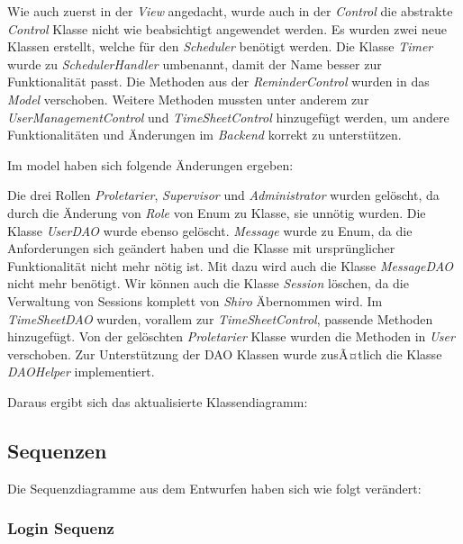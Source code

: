 Wie auch zuerst in der \emph{View} angedacht, wurde auch in der \emph{Control} die abstrakte \emph{Control} Klasse 
nicht wie beabsichtigt angewendet werden.
Es wurden zwei neue Klassen erstellt, welche für den \emph{Scheduler} benötigt werden. 
Die Klasse \emph{Timer} wurde zu \emph{SchedulerHandler} umbenannt, damit der Name besser zur Funktionalität passt.
Die Methoden aus der \emph{ReminderControl} wurden in das \emph{Model} verschoben.
Weitere Methoden mussten unter anderem zur \emph{UserManagementControl} und \emph{TimeSheetControl} hinzugefügt werden, 
um andere Funktionalitäten und Änderungen im \emph{Backend} korrekt zu unterstützen.

Im model haben sich folgende Änderungen ergeben: %

Die drei Rollen \emph{Proletarier}, \emph{Supervisor} und \emph{Administrator} wurden gelöscht, da durch 
die Änderung von \emph{Role} von Enum zu Klasse, sie unnötig wurden. Die Klasse \emph{UserDAO} wurde ebenso gelöscht.
\emph{Message} wurde zu Enum, da die Anforderungen sich geändert haben und 
die Klasse mit ursprünglicher Funktionalität nicht mehr nötig ist. Mit dazu wird auch die Klasse \emph{MessageDAO} nicht mehr benötigt.
Wir können auch die Klasse \emph{Session} löschen, da die Verwaltung von Sessions komplett von \emph{Shiro} Äbernommen wird.
Im \emph{TimeSheetDAO} wurden, vorallem zur \emph{TimeSheetControl}, passende Methoden hinzugefügt.
Von der gelöschten \emph{Proletarier} Klasse wurden die Methoden in \emph{User} verschoben.
Zur Unterstützung der DAO Klassen wurde zusÃ¤tlich die Klasse \emph{DAOHelper} implementiert.

Daraus ergibt sich das aktualisierte Klassendiagramm:


\subsection{Sequenzen}
Die Sequenzdiagramme aus dem Entwurfen haben sich wie folgt verändert:
\subsubsection{Login Sequenz}

